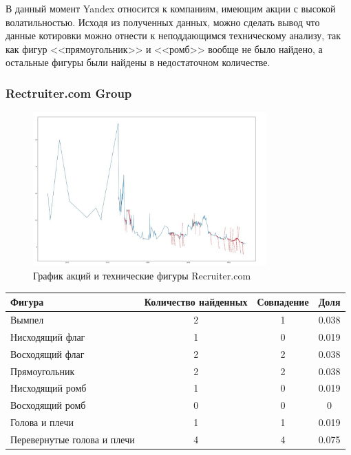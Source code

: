 \documentclass[bachelor, och, coursework]{SCWorks}
\begin{document}
    В данный момент Yandex относится к компаниям, имеющим акции с 
    высокой волатильностью. Исходя из полученных данных, можно сделать вывод
    что данные котировки можно отнести к неподдающимся техническому анализу, 
    так как фигур <<прямоугольник>> и <<ромб>> вообще не было найдено, а
    остальные фигуры были найдены в недостаточном количестве.
    

    \subsubsection{Rectruiter.com Group}
    
    \begin{figure}[H]
        \centering
        \includegraphics[width=0.8\textwidth]{pic/RCRT.jpg}
        \caption{График акций и технические фигуры Recruiter.com}
    \end{figure}
   
    \begin{table}[!hbt]
        \centering
        \begin{tabular}{|l|c|c|c|}
        \hline
        Фигура                      & \multicolumn{1}{l|}{Количество найденных} & Совпадение & Доля  \\ \hline
        Вымпел                      & 2                                         & 1          & 0.038 \\ \hline
        Нисходящий флаг             & 1                                         & 0          & 0.019 \\ \hline
        Восходящий флаг             & 2                                         & 2          & 0.038 \\ \hline
        Прямоугольник               & 2                                         & 2          & 0.038 \\ \hline
        Нисходящий ромб             & 1                                         & 0          & 0.019 \\ \hline
        Восходящий ромб             & 0                                         & 0          & 0     \\ \hline
        Голова и плечи              & 1                                         & 1          & 0.019 \\ \hline
        Перевернутые голова и плечи & 4                                         & 4          & 0.075 \\ \hline
        \end{tabular}
        \end{table}
\end{document}
